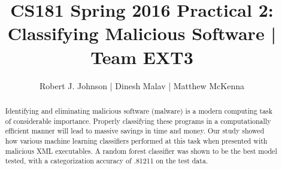 \documentclass{article}
\begin{document}
\title{CS181 Spring 2016 Practical 2: Classifying Malicious Software | Team EXT3}
\author{Robert J. Johnson | Dinesh Malav | Matthew McKenna}



\maketitle

\begin{abstract}
Identifying and eliminating malicious software (malware) is a modern computing task of considerable importance. Properly classifying these programs in a computationally efficient manner will lead to massive savings in time and money. Our study showed how various machine learning classifiers performed at this task when presented with malicious XML executables. A random forest classifier was shown to be the best model tested, with a categorization accuracy of .81211 on the test data. 
\end{abstract}
\end{document}

